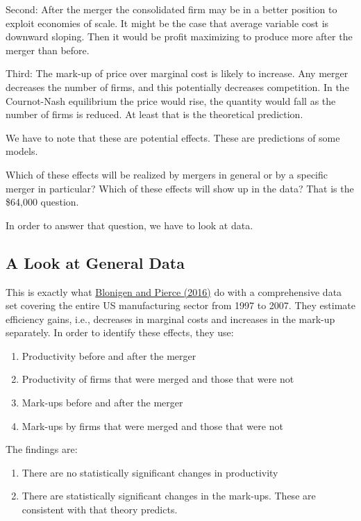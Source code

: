 \documentclass[
]{book}
\providecommand{\tightlist}{%
  \setlength{\itemsep}{0pt}\setlength{\parskip}{0pt}}
\begin{document}
Second: After the merger the consolidated firm may be in a better position to exploit economies of scale. It might be the case that average variable cost is downward sloping. Then it would be profit maximizing to produce more after the merger than before.

Third: The mark-up of price over marginal cost is likely to increase. Any merger decreases the number of firms, and this potentially decreases competition. In the Cournot-Nash equilibrium the price would rise, the quantity would fall as the number of firms is reduced. At least that is the theoretical prediction.

We have to note that these are potential effects. These are predictions of some models.

Which of these effects will be realized by mergers in general or by a specific merger in particular? Which of these effects will show up in the data? That is the \$64,000 question.

In order to answer that question, we have to look at data.

\hypertarget{a-look-at-general-data}{%
\subsection{A Look at General Data}\label{a-look-at-general-data}}

This is exactly what \href{https://www.nber.org/system/files/working_papers/w22750/w22750.pdf}{Blonigen and Pierce (2016)} do with a comprehensive data set covering the entire US manufacturing sector from 1997 to 2007. They estimate efficiency gains, i.e., decreases in marginal costs and increases in the mark-up separately. In order to identify these effects, they use:

\begin{enumerate}
\def\labelenumi{\arabic{enumi}.}
\tightlist
\item
  Productivity before and after the merger
\item
  Productivity of firms that were merged and those that were not
\item
  Mark-ups before and after the merger
\item
  Mark-ups by firms that were merged and those that were not
\end{enumerate}

The findings are:

\begin{enumerate}
\def\labelenumi{\arabic{enumi}.}
\tightlist
\item
  There are no statistically significant changes in productivity
\item
  There are statistically significant changes in the mark-ups. These are consistent with that theory predicts.
\end{enumerate}
\end{document}

